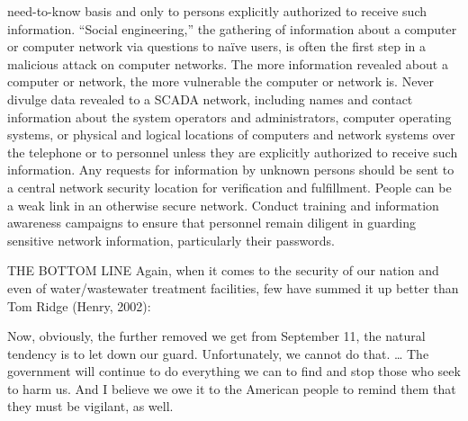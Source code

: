 \documentclass{article}
\begin{document}
\begin{enumerate}
  need-to-know basis and only to persons explicitly authorized to
  receive such information. ``Social engineering,'' the gathering of
  information about a computer or computer network via questions to
  naïve users, is often the first step in a malicious attack on computer
  networks. The more information revealed about a computer or network,
  the more vulnerable the computer or network is. Never divulge data
  revealed to a SCADA network, including names and contact information
  about the system operators and administrators, computer operating
  systems, or physical and logical locations of computers and network
  systems over the telephone or to personnel unless they are explicitly
  authorized to receive such information. Any requests for information
  by unknown persons should be sent to a central network security
  location for verification and fulfillment. People can be a weak link
  in an otherwise secure network. Conduct training and information
  awareness campaigns to ensure that personnel remain diligent in
  guarding sensitive network information, particularly their passwords.
\end{enumerate}

THE BOTTOM LINE Again, when it comes to the security of our nation and
even of water/wastewater treatment facilities, few have summed it up
better than Tom Ridge (Henry, 2002):

Now, obviously, the further removed we get from September 11, the
natural tendency is to let down our guard. Unfortunately, we cannot do
that. \ldots{} The government will continue to do everything we can to
find and stop those who seek to harm us. And I believe we owe it to the
American people to remind them that they must be vigilant, as well.
\end{document}
